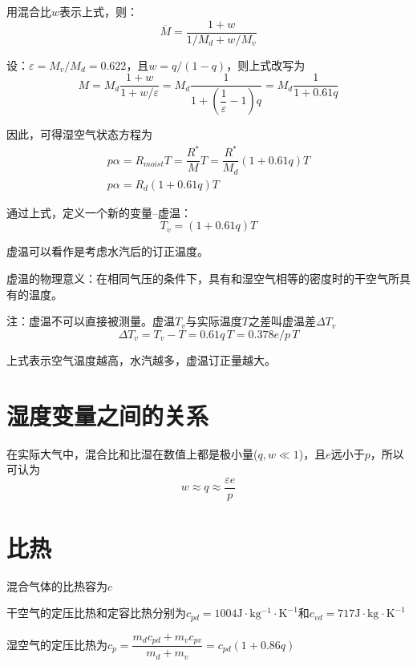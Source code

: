 \documentclass[UTF8,a4paper,11pt,oneside]{ctexbook}
\begin{document}
用混合比\(w\)表示上式，则：
\begin{equation}
    \overline{M}=\dfrac{1+w}{1/M_d+w/M_v}
\end{equation}

设：\(\varepsilon=M_v/M_d=0.622\)，且\(w=q/(1-q)\)，则上式改写为
\begin{equation}
M=M_d\dfrac{1+w}{1+w/\varepsilon}=M_d\dfrac{1}{1+(\dfrac{1}{\varepsilon}-1)q}=M_d\dfrac{1}{1+0.61q}
\end{equation}

因此，可得湿空气状态方程为
\begin{gather}
    p\alpha=R_{moist}T=\dfrac{R^*}{M}T=\dfrac{R^*}{M_d}(1+0.61q)T\\
    p\alpha=R_d(1+0.61q)T
\end{gather}

通过上式，定义一个新的变量--虚温：
\begin{equation}
    T_v=(1+0.61q)T
\end{equation}

虚温可以看作是考虑水汽后的订正温度。

虚温的物理意义：在相同气压的条件下，具有和湿空气相等的密度时的干空气所具有的温度。

注：虚温不可以直接被测量。虚温\(T_v\)与实际温度\(T\)之差叫虚温差\(\Delta{}T_v\)
\begin{equation}
\Delta{}T_v=T_v-T=0.61q\,T=0.378e/p\,T
\end{equation}

上式表示空气温度越高，水汽越多，虚温订正量越大。

\section{湿度变量之间的关系}

在实际大气中，混合比和比湿在数值上都是极小量(\(q,w\ll 1\))，且\(e\)远小于\(p\)，所以可认为
\begin{equation}
w\approx{}q\approx\dfrac{\varepsilon{}e}{p}
\end{equation}

\section{比热}

混合气体的比热容为\(c\)

干空气的定压比热和定容比热分别为\(c_{pd}=1004\mathrm{J\cdot{}kg^{-1}\cdot{}K^{-1}}\)和\(c_{vd}=717\mathrm{J\cdot{}kg^{}\cdot{}K^{-1}}\)

湿空气的定压比热为\(c_p=\dfrac{m_dc_{pd}+m_vc_{pv}}{m_d+m_v}=c_{pd}(1+0.86q)\)
\end{document}
